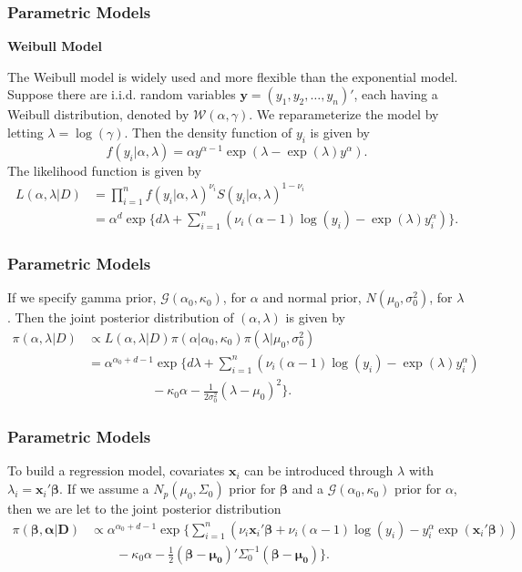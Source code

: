 \documentclass{beamer}
\begin{document}
	\begin{frame}
		\frametitle{Parametric Models}
		\textbf{Weibull Model}
		
		The Weibull model is widely used and more flexible than the exponential model. Suppose there are i.i.d. random variables $\boldsymbol{y} = (y_1, y_2, \dots, y_n)'$, each having a Weibull distribution, denoted by $\mathcal{W}(\alpha, \gamma)$. We reparameterize the model by letting $\lambda = \log(\gamma)$. Then the density function of $y_i$ is given by 
		\[
		f(y_i | \alpha, \lambda) = \alpha y ^ {\alpha - 1}\exp(\lambda - \exp(\lambda)y ^ {\alpha}).
		\] 
		The likelihood function is given by
		\begin{align*}
			L(\alpha, \lambda | D) & = \prod_{i = 1}^{n}f(y_i | \alpha, \lambda) ^ {\nu_i}S(y_i | \alpha, \lambda) ^ {1 - \nu_i} \\
			& = \alpha ^ d \exp\{d\lambda + \sum_{i = 1}^{n}(\nu_i(\alpha - 1)\log(y_i) - \exp(\lambda)y_i ^ {\alpha})\}.
		\end{align*}
	\end{frame}
	
	\begin{frame}
		\frametitle{Parametric Models}
		If we specify gamma prior, $\mathcal{G}(\alpha_0, \kappa_0)$, for $\alpha$ and normal prior, $N(\mu_0, \sigma_0 ^ 2)$, for $\lambda$. Then the joint posterior distribution of $(\alpha, \lambda)$ is given by
		\begin{equation*}
			\begin{split}
				\pi(\alpha, \lambda | D) & \propto L(\alpha, \lambda | D) \pi(\alpha | \alpha_0, \kappa_0)\pi(\lambda | \mu_0, \sigma_0 ^ 2) \\
				& = \alpha ^ {\alpha_0 + d - 1} \exp\{d\lambda + \sum_{i = 1}^{n}(\nu_i(\alpha - 1)\log(y_i) - \exp(\lambda)y_i ^ {\alpha}) \\ 
				& \quad\quad\quad\quad\quad - \kappa_0\alpha - \frac{1}{2\sigma_0 ^ 2}(\lambda - \mu_0) ^ 2\}.
			\end{split}
		\end{equation*}
	\end{frame}
	
	\begin{frame}
		\frametitle{Parametric Models}
		To build a regression model, covariates $\boldsymbol{x}_i$ can be introduced through $\lambda$ with $\lambda_i = \boldsymbol{x}_i'\boldsymbol{\beta}$. If we assume a $N_p(\mu_0, \Sigma_0)$ prior for $\boldsymbol{\beta}$ and a $\mathcal{G}(\alpha_0, \kappa_0)$ prior for $\alpha$, then we are let to the joint posterior distribution
		\begin{equation*}
			\begin{split}
				\pi(\boldsymbol{\beta, \alpha | D}) & \propto \alpha ^ {\alpha_0 + d - 1}\exp\{\sum_{i = 1}^{n}(\nu_i\boldsymbol{x}_i'\boldsymbol{\beta} + \nu_i(\alpha - 1)\log(y_i) - y_i ^ {\alpha}\exp( \boldsymbol{x}_i'\boldsymbol{\beta})) \\
				& \quad\quad - \kappa_0\alpha - \frac{1}{2}(\boldsymbol{\beta} - \boldsymbol{\mu_0})' \Sigma_0 ^ {-1}(\boldsymbol{\beta} - \boldsymbol{\mu_0})\}.			
			\end{split}
		\end{equation*}
	\end{frame}
	
\end{document}
